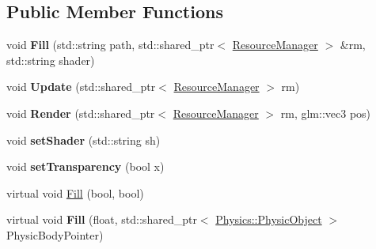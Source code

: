 \subsection*{Public Member Functions}
\begin{DoxyCompactItemize}
\item 
void {\bfseries Fill} (std\+::string path, std\+::shared\+\_\+ptr$<$ \hyperlink{class_resource_manager}{Resource\+Manager} $>$ \&rm, std\+::string shader)\hypertarget{class_component_1_1_render_component_ad152afe46068c7b00f85ccd6bd98f90c}{}\label{class_component_1_1_render_component_ad152afe46068c7b00f85ccd6bd98f90c}

\item 
void {\bfseries Update} (std\+::shared\+\_\+ptr$<$ \hyperlink{class_resource_manager}{Resource\+Manager} $>$ rm)\hypertarget{class_component_1_1_render_component_a718f61cfd8e4c69918efa56194bfac75}{}\label{class_component_1_1_render_component_a718f61cfd8e4c69918efa56194bfac75}

\item 
void {\bfseries Render} (std\+::shared\+\_\+ptr$<$ \hyperlink{class_resource_manager}{Resource\+Manager} $>$ rm, glm\+::vec3 pos)\hypertarget{class_component_1_1_render_component_a85240742053d9b11aa8c2d475de0e296}{}\label{class_component_1_1_render_component_a85240742053d9b11aa8c2d475de0e296}

\item 
void {\bfseries set\+Shader} (std\+::string sh)\hypertarget{class_component_1_1_render_component_ae3eae47c6ae0d6d2e6a93949bc1864e2}{}\label{class_component_1_1_render_component_ae3eae47c6ae0d6d2e6a93949bc1864e2}

\item 
void {\bfseries set\+Transparency} (bool x)\hypertarget{class_component_1_1_render_component_ae99354a0e520dba9be9e9ef52a7a76e1}{}\label{class_component_1_1_render_component_ae99354a0e520dba9be9e9ef52a7a76e1}

\item 
virtual void \hyperlink{class_component_1_1_render_component_a4f14696af9c2b7b24c708139fccfad04}{Fill} (bool, bool)
\item 
virtual void {\bfseries Fill} (float, std\+::shared\+\_\+ptr$<$ \hyperlink{class_physics_1_1_physic_object}{Physics\+::\+Physic\+Object} $>$ Physic\+Body\+Pointer)\hypertarget{class_component_1_1_render_component_a0f398fb6067ce5dd3895a9ec45954d1e}{}\label{class_component_1_1_render_component_a0f398fb6067ce5dd3895a9ec45954d1e}

\end{DoxyCompactItemize}
